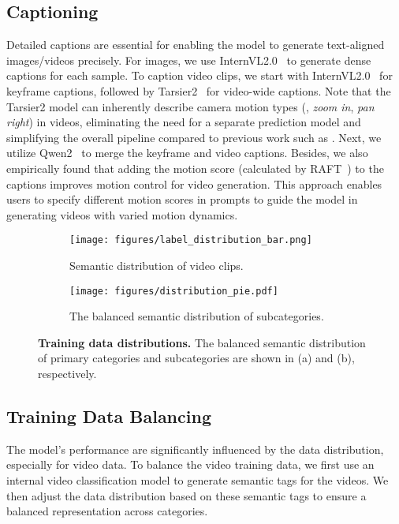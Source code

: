 \subsection{Captioning}\label{sec:captions}
Detailed captions are essential for enabling the model to generate text-aligned images/videos precisely. For images, we use InternVL2.0~\citep{chen2024far} to generate dense captions for each sample. To caption video clips, we start with InternVL2.0~\citep{chen2024far} for keyframe captions, followed by Tarsier2~\citep{yuan2025tarsier2} for video-wide captions. Note that the Tarsier2 model can inherently describe camera motion types (\eg, \emph{zoom in}, \emph{pan right}) in videos, eliminating the need for a separate prediction model and simplifying the overall pipeline compared to previous work such as \citep{polyak2024movie}.
Next, we utilize Qwen2~\citep{yang2024qwen2} to merge the keyframe and video captions. Besides, we also empirically found that adding the motion score (calculated by RAFT~\citep{teed2020raft}) to the captions improves motion control for video generation. This approach enables users to specify different motion scores in prompts to guide the model in generating videos with varied motion dynamics. 


\begin{figure}[t]
    \centering
    \begin{subfigure}{\linewidth}
        \centering
        \texttt{[image: figures/label\_distribution\_bar.png]} 
        \caption{Semantic distribution of video clips.}
        \label{fig:data-semantic-distribution}
    \end{subfigure}
    \vspace{5pt}
    \begin{subfigure}{\linewidth}
        \centering
        \texttt{[image: figures/distribution\_pie.pdf]} 
        \caption{The balanced semantic distribution of subcategories.}\label{fig:data-balanced}
    \end{subfigure}
    \caption{\textbf{Training data distributions.} The balanced semantic distribution of primary categories and subcategories are shown in (a) and (b), respectively.}
    \label{fig:video-data-distribution}
\end{figure}

\subsection{Training Data Balancing}\label{sec:balance}
The model’s performance are significantly influenced by the data distribution, especially for video data. To balance the video training data, we first use an internal video classification model to generate semantic tags for the videos. We then adjust the data distribution based on these semantic tags to ensure a balanced representation across categories.


